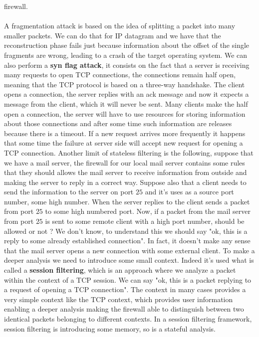 \documentclass[11pt]{article}
\begin{document}
firewall.\\\\A fragmentation attack is based on the idea of splitting a packet into many smaller packets. We can do that for IP datagram and we have that the reconstruction phase fails just because information about the offset of the single fragments are wrong, leading to a crash of the target operating system. We can also perform a \textbf{syn flag attack}, it consists on the fact that a server is receiving many requests to open TCP connections, the connections remain half open, meaning that the TCP protocol is based on a three-way handshake. The client opens a connection, the server replies with an ack message and now it expects a message from the client, which it will never be sent. Many clients make the half open a connection, the server will have to use resources for storing information about those connections and after some time such information are releases because there is a timeout. If a new request arrives more frequently it happens that some time the failure at server side will accept new request for opening a TCP connection. Another limit of stateless filtering is the following, suppose that we have a mail server, the firewall for our local mail server contains some rules that they should allows the mail server to receive information from outside and making the server to reply in a correct way. Suppose also that a client needs to send the information to the server on port $25$ and it's uses as a source port number, some high number. When the server replies to the client sends a packet from port $25$ to some high numbered port. Now, if a packet from the mail server from port $25$ is sent to some remote client with a high port number, should be allowed or not ? We don't know, to understand this we should say "ok, this is a reply to some already established connection". In fact, it doesn't make any sense that the mail server opens a new connection with some external client. To make a deeper analysis we need to introduce some small context. Indeed it's used what is called a \textbf{session filtering}, which is an approach where we analyze a packet within the context of a TCP session. We can say "ok, this is a packet replying to a request of opening a TCP connection". The context in many cases provides a very simple context like the TCP context, which provides user information enabling a deeper analysis making the firewall able to distinguish between two identical packets belonging to different contexts. In a session filtering framework, session filtering is introducing some memory, so is a stateful analysis.
\end{document}
